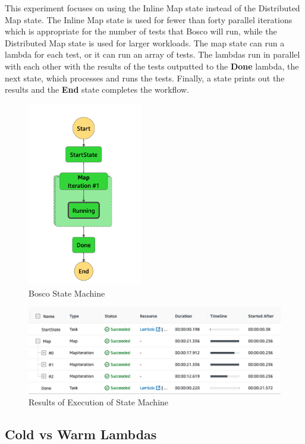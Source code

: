 \documentclass[12pt,a4paper,titlepage]{report}
\begin{document}
This experiment focuses on using the Inline Map state instead of the Distributed Map state. The Inline Map state is used for fewer than forty parallel iterations which is appropriate for the number of tests that Bosco will run, while the Distributed Map state is used for larger workloads. 
The map state can run a lambda for each test, or it can run an array of tests. The lambdas run in parallel with each other with the results of the tests outputted to the \textbf{Done} lambda, the next state, which processes and runs the tests. Finally, a state prints out the results and the \textbf{End} state completes the workflow.

\begin{figure}[H]
 \centering
 \includegraphics[width=5cm]{./diagrams/step_function}
 \caption{Bosco State Machine}
\end{figure}

\begin{figure}[H]
 \centering
 \includegraphics[width=15cm]{./diagrams/tablestepfx.png}
 \caption{Results of Execution of State Machine}
\end{figure}

\subsection{Cold vs Warm Lambdas}
\end{document}
